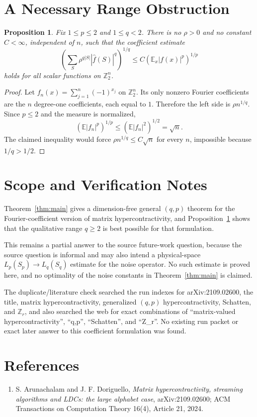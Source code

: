 \documentclass[11pt]{article}
\newtheorem{proposition}{Proposition}
\newcommand{\Z}{\mathbb Z}
\newcommand{\E}{\mathbb E}
\begin{document}
\section*{A Necessary Range Obstruction}

\begin{proposition}
\label{prop:obstruction}
Fix $1\leq p\leq 2$ and $1\leq q<2$. There is no $\rho>0$ and no constant
$C<\infty$, independent of $n$, such that the coefficient estimate
\[
  \left(\sum_S \rho^{q|S|}|\widehat f(S)|^q\right)^{1/q}
  \leq C\left(\E_x |f(x)|^p\right)^{1/p}
\]
holds for all scalar functions on $\Z_2^n$.
\end{proposition}

\begin{proof}
Let $f_n(x)=\sum_{j=1}^n (-1)^{x_j}$ on $\Z_2^n$. Its only nonzero Fourier
coefficients are the $n$ degree-one coefficients, each equal to $1$. Therefore
the left side is $\rho n^{1/q}$. Since $p\leq 2$ and the measure is normalized,
\[
  \left(\E |f_n|^p\right)^{1/p}
  \leq
  \left(\E |f_n|^2\right)^{1/2}
  =
  \sqrt n.
\]
The claimed inequality would force
$\rho n^{1/q}\leq C\sqrt n$ for every $n$, impossible because
$1/q>1/2$.
\end{proof}

\section*{Scope and Verification Notes}

Theorem~\ref{thm:main} gives a dimension-free general $(q,p)$ theorem for the
Fourier-coefficient version of matrix hypercontractivity, and
Proposition~\ref{prop:obstruction} shows that the qualitative range
$q\geq2$ is best possible for that formulation.

This remains a partial answer to the source future-work question, because the
source question is informal and may also intend a physical-space
$L_p(S_p)\to L_q(S_q)$ estimate for the noise operator. No such estimate is
proved here, and no optimality of the noise constants in
Theorem~\ref{thm:main} is claimed.

The duplicate/literature check searched the run indexes for arXiv:2109.02600,
the title, matrix hypercontractivity, generalized $(q,p)$ hypercontractivity,
Schatten, and $\Z_r$, and also searched the web for exact combinations of
``matrix-valued hypercontractivity'', ``q,p'', ``Schatten'', and ``Z\_r''.
No existing run packet or exact later answer to this coefficient formulation
was found.

\section*{References}

\begin{enumerate}
\item S. Arunachalam and J. F. Doriguello,
\emph{Matrix hypercontractivity, streaming algorithms and LDCs: the large
alphabet case}, arXiv:2109.02600; ACM Transactions on Computation Theory
16(4), Article 21, 2024.
\end{enumerate}
\end{document}

